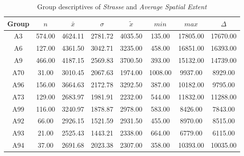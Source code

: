 \begin{table}[ht]
	\tiny
	\centering
	\begin{tabular}{c|c|c|c|c|c|c|c}
	  	\toprule
	 	Group & $n$ & $\bar{x}$ & $\sigma$ & $\tilde{x}$ & $min$ & $max$ & $\Delta$ \\  
	  	\midrule
		A3 & 574.00 & 4624.11 & 2781.72 & 4035.50 & 135.00 & 17805.00 & 17670.00 \\ 
	  	A6 & 127.00 & 4361.50 & 3042.71 & 3235.00 & 458.00 & 16851.00 & 16393.00 \\ 
	  	A9 & 466.00 & 4187.15 & 2569.83 & 3700.50 & 393.00 & 15132.00 & 14739.00 \\ 
	  	A70 & 31.00 & 3010.45 & 2067.63 & 1974.00 & 1008.00 & 9937.00 & 8929.00 \\ 
	  	A96 & 156.00 & 3664.63 & 2172.78 & 3292.50 & 387.00 & 10182.00 & 9795.00 \\ 
	  	A73 & 129.00 & 2683.97 & 1981.91 & 2232.00 & 544.00 & 11832.00 & 11288.00 \\ 
	  	A99 & 116.00 & 3240.97 & 1878.87 & 2978.00 & 583.00 & 8426.00 & 7843.00 \\ 
	  	A92 & 66.00 & 2926.15 & 1521.59 & 2931.50 & 455.00 & 8970.00 & 8515.00 \\ 
	  	A93 & 21.00 & 2525.43 & 1443.21 & 2338.00 & 664.00 & 6779.00 & 6115.00 \\ 
	  	A94 & 37.00 & 2691.68 & 2023.38 & 2307.00 & 358.00 & 10393.00 & 10035.00 \\ 
	   	\bottomrule
	\end{tabular}
	\caption{Group descriptives of \textit{Strasse} and \textit{Average Spatial Extent}}
	\label{tbl:descriptives_baysis_matched_Strasse_SAvg}
\end{table}

